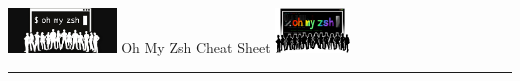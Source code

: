 \documentclass[10pt]{article}
\begin{document}
\pagestyle{empty}

\begin{center}
  \includegraphics[height=1.2cm]{zsh.png}
  \hspace{1em}
  {\titlefont\large \color{mygreen}Oh My Zsh Cheat Sheet}
  \hspace{1em}
  \includegraphics[height=1.2cm]{zsh2.png}

  \vspace{0.3em}
  \textcolor{lightgray}{\rule{\linewidth}{0.5pt}}
\end{center}

\vspace{0.5em}
\end{document}
